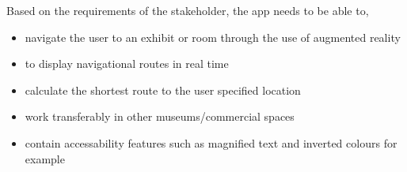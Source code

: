 Based on the requirements of the stakeholder, the app needs to be able to,

\begin{itemize}
    \item navigate the user to an exhibit or room through the use of augmented reality
    \item to display navigational routes in real time
    \item calculate the shortest route to the user specified location 
    \item work transferably in other museums/commercial spaces
    \item contain accessability features such as magnified text and inverted colours for example
\end{itemize}
